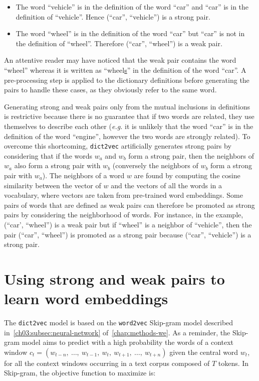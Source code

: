     \begin{itemize}
      \item The word \textcolor{cerise}{``vehicle''} is in the definition of the
        word \textcolor{cobalt}{``car''} and \textcolor{cobalt}{``car''} is in
        the definition of \textcolor{cerise}{``vehicle''}.  Hence
        (\textcolor{cobalt}{``car''}, \textcolor{cerise}{``vehicle''}) is a
        strong pair.
      \item The word \textcolor{jade}{``wheel''} is in the definition of the
        word \textcolor{cobalt}{``car''} but \textcolor{cobalt}{``car''} is not
        in the definition of \textcolor{jade}{``wheel''}. Therefore
        (\textcolor{cobalt}{``car''}, \textcolor{jade}{``wheel''}) is a weak
        pair.
    \end{itemize}

    \noindent An attentive reader may have noticed that the weak pair contains
    the word ``wheel'' whereas it is written as ``wheel\underline{s}'' in the
    definition of the word ``car''. A pre-processing step is applied to the
    dictionary definitions before generating the pairs to handle these cases, as
    they obviously refer to the same word.\medskip

    Generating strong and weak pairs only from the mutual inclusions in
    definitions is restrictive because there is no guarantee that if two words
    are related, they use themselves to describe each other (\textit{e.g.} it is
    unlikely that the word ``car'' is in the definition of the word ``engine'',
    however the two words are strongly related). To overcome this shortcoming,
    \texttt{dict2vec} artificially generates strong pairs by considering that if
    the words $w_a$ and $w_b$ form a strong pair, then the neighbors of $w_a$
    also form a strong pair with $w_b$ (conversely the neighbors of $w_b$ form a
    strong pair with $w_a$).  The neighbors of a word $w$ are found by computing
    the cosine similarity between the vector of $w$ and the vectors of all the
    words in a vocabulary, where vectors are taken from pre-trained word
    embeddings. Some pairs of words that are defined as weak pairs can therefore
    be promoted as strong pairs by considering the neighborhood of words. For
    instance, in the example, (``car', ``wheel'') is a weak pair but if
    ``wheel'' is a neighbor of ``vehicle'', then the pair (``car'', ``wheel'')
    is promoted as a strong pair because (``car'', ``vehicle'') is a strong
    pair.

\section{Using strong and weak pairs to learn word embeddings}
  \label{ch05:sec:dict2vec}
  The \texttt{dict2vec} model is based on the \texttt{word2vec} Skip-gram model
  described in~\autoref{ch03:subsec:neural-network}
  of~\autoref{chap:methods-we}. As a reminder, the Skip-gram model aims to predict
  with a high probability the words of a context window $c_t = (w_{t-n}, ~\dots,
  ~w_{t-1}, ~w_t, ~w_{t+1}, ~\dots, ~w_{t+n})$ given the central word $w_t$, for
  all the context windows occurring in a text corpus composed of $T$ tokens. In
  Skip-gram, the objective function to maximize is:

